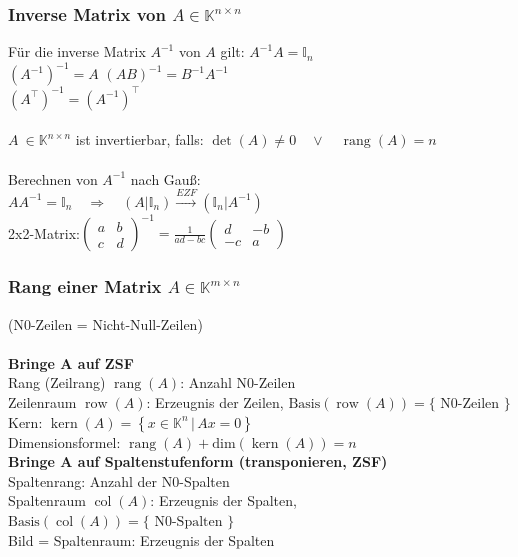 \documentclass[6pt,a4paper]{scrartcl}
\newcommand{\dme}[2]{\ensuremath{\left\{#1\,\vert\,#2 \right\}}}
\newcommand{\enbrace}[1]{\ensuremath{\left(#1\right)}}
\DeclareMathOperator{\rang}{rang}
\DeclareMathOperator{\col}{col}
\DeclareMathOperator{\row}{row}
\DeclareMathOperator{\Kern}{kern}
\begin{document}
\begin{multicols*}{4}
\subsubsection{Inverse Matrix von $A\in \mathbb K^{n\times n}$}
Für die inverse Matrix $A^{-1}$ von $A$ gilt: $A^{-1}A=\mathbb{I}_n$\\
$(A^{-1})^{-1}=A$ \qquad $(AB)^{-1}=B^{-1}A^{-1}$ \\
$(A^\top)^{-1}=(A^{-1})^\top$\\
\\
$A\ \in \mathbb K^{n\times n}$ ist invertierbar, falls: $\det (A) \ne 0 \quad \lor \quad \rang(A)=n$\\
\\
Berechnen von $A^{-1}$ nach Gauß:\\
$AA^{-1}=\mathbb{I}_n\quad\Rightarrow\quad (A|\mathbb{I}_n)\overset{EZF}{\longrightarrow}(\mathbb{I}_n|A^{-1})$\\
2x2-Matrix:$\enbrace{\begin{matrix}
a & b \\
c & d
\end{matrix}}^{-1} = \frac{1}{ad-bc}\begin{pmatrix}
d & -b \\
-c & a
\end{pmatrix}$

\subsubsection{Rang einer Matrix $A\in \mathbb K^{m\times n}$}
{\tiny (N0-Zeilen = Nicht-Null-Zeilen)}\\ \\
\textbf{Bringe A auf ZSF} \\
Rang (Zeilrang) $\rang(A)$: Anzahl N0-Zeilen \\     
Zeilenraum $\row(A)$: Erzeugnis der Zeilen, $\text{Basis}(\row(A)) = \{\text{ N0-Zeilen }\}$ \\
Kern: $\Kern(A) = \dme{x \in \mathbb K^n}{Ax= 0}$ \\
Dimensionsformel: $\rang(A) + \mathrm{dim}(\Kern(A)) = n$ \\
\textbf{Bringe A auf Spaltenstufenform (transponieren, ZSF)} \\
Spaltenrang: Anzahl der N0-Spalten\\
Spaltenraum $\col(A)$: Erzeugnis der Spalten, $\text{Basis}(\col(A)) = \{\text{ N0-Spalten }\}$ \\
Bild = Spaltenraum: Erzeugnis der Spalten 

\end{multicols*}
\end{document}
